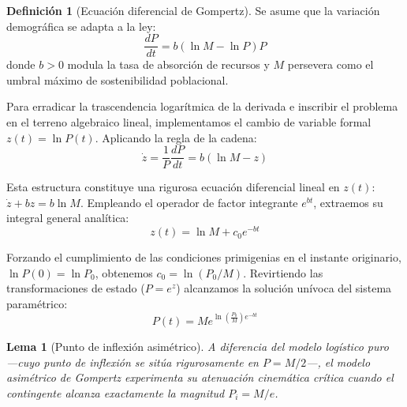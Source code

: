 \documentclass[11pt,a4paper]{article}
\theoremstyle{definition}
\newtheorem{definition}{Definición}[section]
\theoremstyle{plain}
\newtheorem{lemma}{Lema}[section]
\begin{document}
\begin{definition}[Ecuación diferencial de Gompertz]
Se asume que la variación demográfica se adapta a la ley:
\begin{equation}
    \frac{dP}{dt} = b(\ln M - \ln P)P
\end{equation}
donde $b > 0$ modula la tasa de absorción de recursos y $M$ persevera como el umbral máximo de sostenibilidad poblacional.
\end{definition}

Para erradicar la trascendencia logarítmica de la derivada e inscribir el problema en el terreno algebraico lineal, implementamos el cambio de variable formal $z(t) = \ln P(t)$. Aplicando la regla de la cadena:
\begin{equation*}
    \dot{z} = \frac{1}{P}\frac{dP}{dt} = b(\ln M - z)
\end{equation*}

Esta estructura constituye una rigurosa ecuación diferencial lineal en $z(t)$: $\dot{z} + bz = b\ln M$. Empleando el operador de factor integrante $e^{bt}$, extraemos su integral general analítica:
\begin{equation}
    z(t) = \ln M + c_0 e^{-bt}
\end{equation}

Forzando el cumplimiento de las condiciones primigenias en el instante originario, $\ln P(0) = \ln P_0$, obtenemos $c_0 = \ln(P_0/M)$. Revirtiendo las transformaciones de estado ($P = e^z$) alcanzamos la solución unívoca del sistema paramétrico:
\begin{equation}
    P(t) = M e^{\ln\left(\frac{P_0}{M}\right)e^{-bt}}
\end{equation}

\begin{lemma}[Punto de inflexión asimétrico]
A diferencia del modelo logístico puro —cuyo punto de inflexión se sitúa rigurosamente en $P = M/2$—, el modelo asimétrico de Gompertz experimenta su atenuación cinemática crítica cuando el contingente alcanza exactamente la magnitud $P_i = M/e$.
\end{lemma}
\end{document}
